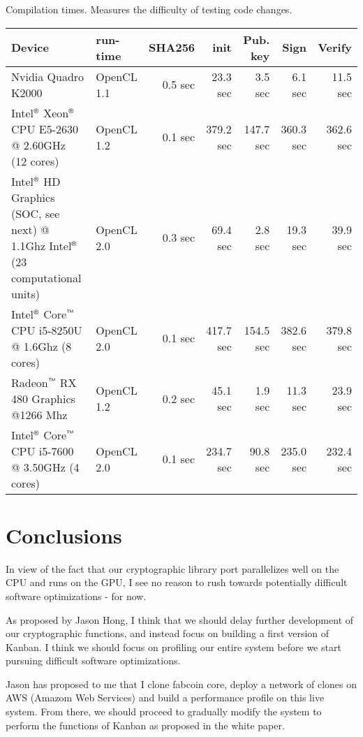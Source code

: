 \documentclass{article}
\begin{document}
Compilation times. Measures the difficulty of testing code changes.

\noindent\begin{tabular}{|p{5cm}|l|r||r|r|r|r|}\hline
	Device & run-time & SHA256 & init& Pub. key & Sign & Verify\\\hline
	Nvidia Quadro K2000 & OpenCL 1.1 &0.5 sec& 23.3 sec &3.5 sec &6.1 sec &11.5 sec\\\hline 
	Intel${}^{\text{\sffamily\textregistered}}$ Xeon${}^{\text{\sffamily\textregistered}}$ CPU E5-2630 @ 2.60GHz (12 cores)&  OpenCL 1.2&0.1 sec&379.2 sec&147.7 sec&360.3 sec&362.6 sec\\\hline \hline
	Intel${}^{\text{\sffamily\textregistered}}$ HD Graphics (SOC, see next) @ 1.1Ghz Intel${}^{\text{\sffamily\textregistered}}$ (23 computational units)& OpenCL 2.0& 0.3 sec &69.4 sec &2.8 sec&19.3 sec   & 39.9 sec \\\hline
	Intel${}^{\text{\sffamily\textregistered}}$ Core${}^{\text{\sffamily\texttrademark}}$ CPU 
	i5-8250U @ 1.6Ghz (8 cores)& OpenCL 2.0&0.1 sec&417.7 sec &154.5 sec &382.6 sec &379.8 sec \\\hline\hline 
	Radeon${}^{\text{\sffamily\texttrademark}}$ RX 480 Graphics @1266 Mhz &OpenCL 1.2&0.2 sec  &45.1 sec &1.9 sec&11.3 sec&23.9 sec \\\hline 
	Intel${}^{\text{\sffamily\textregistered}}$ Core${}^{\text{\sffamily\texttrademark}}$ CPU i5-7600 @ 3.50GHz (4 cores)&OpenCL 2.0&0.1 sec&234.7 sec&90.8 sec&235.0 sec&232.4 sec \\\hline
\end{tabular}




\section{Conclusions}
In view of the fact that our cryptographic library port parallelizes well on the CPU and runs on the GPU, I see no reason to rush towards potentially difficult software optimizations - for now. 

As proposed by Jason Hong, I think that we should delay further development of our cryptographic functions, and instead focus on building a first version of Kanban. I think we should focus on profiling our entire system before we start pursuing difficult software optimizations. 

Jason has proposed to me that I clone fabcoin core, deploy a network of clones on AWS (Amazom Web Services) and build a performance profile on this live system. From there, we should proceed to gradually modify the system to perform the functions of Kanban as proposed in the white paper.
\end{document}
